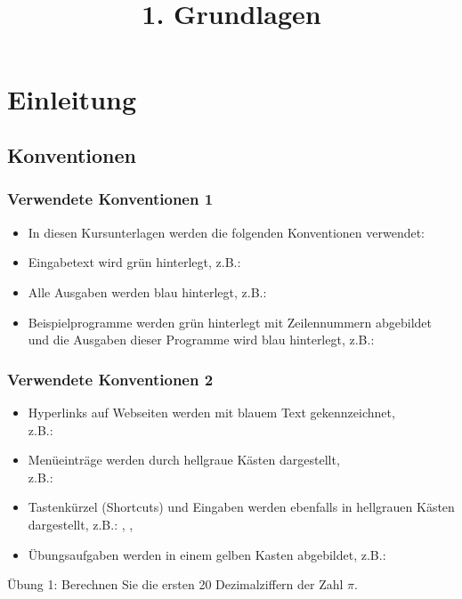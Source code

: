 

\title{\\{\scriptsize 1. Grundlagen}}


\setcounter{mexercise}{0}


    

    \section{Einleitung}

    \subsection{Konventionen}
    \begin{frame}
        \frametitle{Verwendete Konventionen 1}
        \begin{itemize}
            \item In diesen Kursunterlagen werden die folgenden Konventionen verwendet:
            \item Eingabetext wird grün hinterlegt, z.B.: 
            \item Alle Ausgaben werden blau hinterlegt, z.B.: 
            \item Beispielprogramme werden grün hinterlegt mit Zeilennummern abgebildet und die Ausgaben dieser Programme
            wird blau hinterlegt, z.B.:
        \end{itemize}
    \end{frame}

    \begin{frame}
        \frametitle{Verwendete Konventionen 2}
        \begin{itemize}
            \item Hyperlinks auf Webseiten werden mit blauem Text gekennzeichnet, \\
            z.B.: 
            \item Menüeinträge werden durch hellgraue Kästen dargestellt, \\
            z.B.: 
            \item Tastenkürzel (Shortcuts) und Eingaben werden ebenfalls in hellgrauen Kästen dargestellt, z.B.: , \keys{\return}, 
            \item Übungsaufgaben werden in einem gelben Kasten abgebildet, z.B.:
        \end{itemize}
        \begin{exercise}
            \sloppy
            Übung 1: Berechnen Sie die ersten 20 Dezimalziffern der Zahl $\pi$.
        \end{exercise}
    \end{frame}


